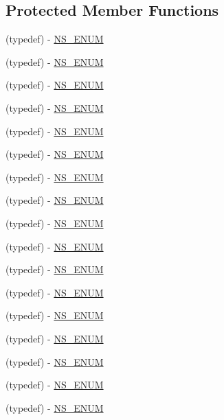 \subsection*{Protected Member Functions}
\begin{DoxyCompactItemize}
\item 
(typedef) -\/ \hyperlink{interface_p_v_camera_settings_def_a2e8190fc2ed2822c87d2a2de739ee3e3}{N\+S\+\_\+\+E\+N\+UM}
\item 
(typedef) -\/ \hyperlink{interface_p_v_camera_settings_def_afec0b438006ee00b12538e963376a740}{N\+S\+\_\+\+E\+N\+UM}
\item 
(typedef) -\/ \hyperlink{interface_p_v_camera_settings_def_ad4ae7cb1db64e521ad5bc88adabd8a70}{N\+S\+\_\+\+E\+N\+UM}
\item 
(typedef) -\/ \hyperlink{interface_p_v_camera_settings_def_a9f239324098cbb9cd366685ea123bdab}{N\+S\+\_\+\+E\+N\+UM}
\item 
(typedef) -\/ \hyperlink{interface_p_v_camera_settings_def_a09f6a47e90f938e37ead70bd57b0b738}{N\+S\+\_\+\+E\+N\+UM}
\item 
(typedef) -\/ \hyperlink{interface_p_v_camera_settings_def_a09722499b1901cbe1482eb730dcfddf7}{N\+S\+\_\+\+E\+N\+UM}
\item 
(typedef) -\/ \hyperlink{interface_p_v_camera_settings_def_adaa98aa8b13696b53d454d706f33dd32}{N\+S\+\_\+\+E\+N\+UM}
\item 
(typedef) -\/ \hyperlink{interface_p_v_camera_settings_def_ac284f9a2d42f5170be560e9677dffc41}{N\+S\+\_\+\+E\+N\+UM}
\item 
(typedef) -\/ \hyperlink{interface_p_v_camera_settings_def_ab1b046407fb33de544eee9c22438c62b}{N\+S\+\_\+\+E\+N\+UM}
\item 
(typedef) -\/ \hyperlink{interface_p_v_camera_settings_def_a692068d660eba798e62875f3918206e2}{N\+S\+\_\+\+E\+N\+UM}
\item 
(typedef) -\/ \hyperlink{interface_p_v_camera_settings_def_ae4de3258d6b62f864f18cf868bc45885}{N\+S\+\_\+\+E\+N\+UM}
\item 
(typedef) -\/ \hyperlink{interface_p_v_camera_settings_def_a0ff3d127f5cc23f518c695cbd6878013}{N\+S\+\_\+\+E\+N\+UM}
\item 
(typedef) -\/ \hyperlink{interface_p_v_camera_settings_def_a906c23b6cfa9935b46706f85c165b650}{N\+S\+\_\+\+E\+N\+UM}
\item 
(typedef) -\/ \hyperlink{interface_p_v_camera_settings_def_a919df1381cc8ab794b4dfb8d20e72308}{N\+S\+\_\+\+E\+N\+UM}
\item 
(typedef) -\/ \hyperlink{interface_p_v_camera_settings_def_a35c0aa51540db13377278fbadfab8d74}{N\+S\+\_\+\+E\+N\+UM}
\item 
(typedef) -\/ \hyperlink{interface_p_v_camera_settings_def_a5cebcfb5e1d577fe2f1df6a3e4f8a780}{N\+S\+\_\+\+E\+N\+UM}
\item 
(typedef) -\/ \hyperlink{interface_p_v_camera_settings_def_a264ef8f1c784aacd7a1b25c5bf8ec369}{N\+S\+\_\+\+E\+N\+UM}
\end{DoxyCompactItemize}


